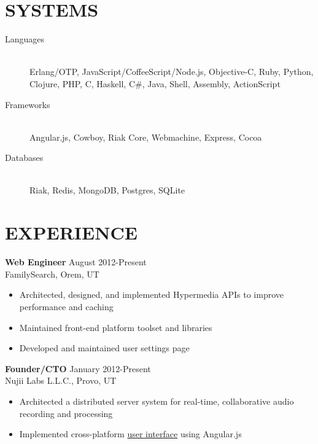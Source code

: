 \documentclass[margin]{res}
\begin{document}

  \address{\bf  377 N 750 E\\Provo, UT 84606\\(801) 803-8577}
  \address{bytheway.cameron@gmail.com\\
           LinkedIn: \href{http://www.linkedin.com/pub/cameron-bytheway/36/a68/993}{Cameron Bytheway}\\
           Github: \href{http://github.com/CamShaft}{CamShaft}}

  \begin{resume}

    \section{SYSTEMS}
      \begin{description}
        \item[Languages] \hfill \\
        Erlang/OTP, JavaScript/CoffeeScript/Node.js, Objective-C, Ruby, Python, Clojure, PHP, C, Haskell, C\#, Java, Shell, Assembly, ActionScript
        \item[Frameworks] \hfill \\
        Angular.js, Cowboy, Riak Core, Webmachine, Express, Cocoa
        \item[Databases] \hfill \\
        Riak, Redis, MongoDB, Postgres, SQLite
      \end{description}

    \section{EXPERIENCE}

      {\bf Web Engineer} \hfill August 2012-Present \\
      FamilySearch, Orem, UT 
      \begin{itemize} \itemsep -2pt
        \item Architected, designed, and implemented Hypermedia APIs to improve performance and caching
        \item Maintained front-end platform toolset and libraries
        \item Developed and maintained user settings page
      \end{itemize}

      {\bf Founder/CTO} \hfill January 2012-Present \\
      Nujii Labs L.L.C., Provo, UT 
      \begin{itemize} \itemsep -2pt
        \item Architected a distributed server system for real-time, collaborative audio recording and processing
        \item Implemented cross-platform 
        \href{https://github.com/nujii/nujiistudio.js}{user interface} using Angular.js
      \end{itemize}


\end{resume}
\end{document}
